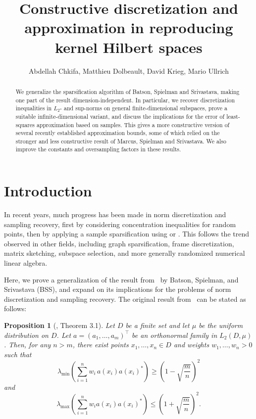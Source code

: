 \documentclass[a4paper,11pt]{article}
\title{
Constructive discretization and approximation in reproducing kernel Hilbert spaces
}
\author{Abdellah Chkifa, Matthieu Dolbeault, David Krieg, Mario Ullrich}
\renewcommand{\(}{\left (}
\renewcommand{\)}{\right )}
\newcommand{\<}{\langle}
\renewcommand{\>}{\rangle}
\newtheorem{prop}[theorem]{Proposition}
\theoremstyle{definition}
\begin{document}
\maketitle
\begin{abstract} 
We generalize the sparsification algorithm of
 Batson, Spielman and Srivastava, 
making one part of the result dimension-independent. 
In particular, we recover discretization inequalities in $L_2$- and sup-norms 
on general finite-dimensional subspaces, prove a suitable infinite-dimen\-sional variant, 
and discuss the implications for the error of least-squares approximation based on samples.
This gives a more constructive version of several recently established approximation bounds, some of which relied on the stronger and less constructive result of Marcus, Spielman and Srivastava. 
We also improve the constants and oversampling factors in these results.
\end{abstract}


\section{Introduction}
\label{sec:intro}
In recent years, much
progress has been made in norm discretization and sampling recovery, first
by considering concentration inequalities for random points,
then by applying a sample sparsification using \cite{MSS} or \cite{BSS}. 
This follows the trend observed in other fields, including graph sparsification, frame discretization, matrix
sketching, subspace selection, and more generally randomized numerical linear algebra.

Here, we prove a generalization of the result from~\cite{BSS} by Batson, Spielman, and Srivastava (BSS), and expand on its implications
for the problems of norm discretization and sampling recovery. 
The original result from~\cite{BSS} can be stated as follows:

\begin{prop}[\cite{BSS}, Theorem 3.1]
\label{thm:BSS}
Let $D$ be a finite set and let $\mu$ be the uniform distribution on $D$. Let $a=(a_1,\hdots,a_m)^\top$
be an orthonormal family in $L_2(D,\mu)$.
Then, for any $n>m$, there exist points $x_1,\dots,x_n\in D$ and weights ${w_1,\dots,w_n>0}$ such that
\[
\lambda_{\min}\left( \sum_{i=1}^n w_i\, a(x_i)a(x_i)^* \right) \geq
\left(1-\sqrt{\frac{m}{n}}\right)^2
\]
and
\[
\lambda_{\max}\left(\sum_{i=1}^n w_ia(x_i)a(x_i)^* \right) \leq \left(1+\sqrt{\frac{m}{n}}\right)^2.
\]
\end{prop}
\end{document}
